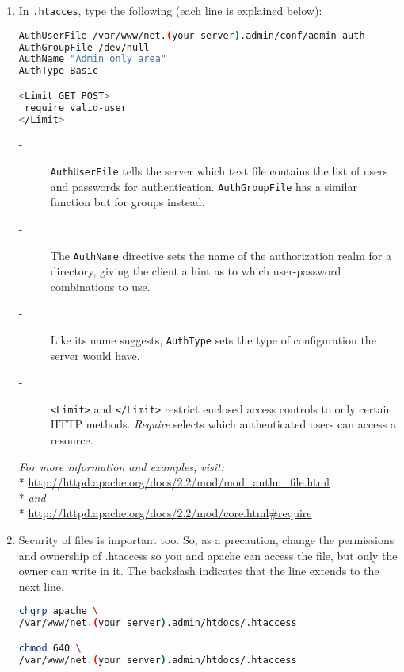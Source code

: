 \documentclass[11pt]{article}
\begin{document}
\begin {itemize}
\begin{enumerate}
    \item In \verb|.htacces|, type the following (each line is explained below):
    \begin{lstlisting}[basicstyle=\ttfamily, backgroundcolor = \color{lightgray}, language = bash, xleftmargin = 0cm, framexleftmargin = 1em, framexrightmargin = 9em, showstringspaces=false] 
AuthUserFile /var/www/net.(your server).admin/conf/admin-auth
AuthGroupFile /dev/null
AuthName "Admin only area"
AuthType Basic

<Limit GET POST>
 require valid-user
</Limit>
\end{lstlisting}
    \begin{description}
      \item[-] \verb|AuthUserFile| tells the server which text file contains the list of users and passwords for authentication. \verb|AuthGroupFile| has a similar function but for groups instead.
      \item[-] The \verb|AuthName| directive sets the name of the authorization realm for a directory, giving the client a hint as to which user-password combinations to use.
      \item[-] Like its name suggests, \verb|AuthType| sets the type of configuration the server would have.
      \item[-] \verb|<Limit>| and \verb|</Limit>| restrict enclosed access controls to only certain HTTP methods. \emph{Require} selects which authenticated users can access a resource.
    \end{description}
    \textit{For more information and examples, visit:}
    \\* \url{http://httpd.apache.org/docs/2.2/mod/mod_authn_file.html}
    \\* \emph{and}
    \\* \url{http://httpd.apache.org/docs/2.2/mod/core.html#require}

    \item Security of files is important too. So, as a precaution, change the permissions and ownership of .htaccess so you and apache can access the file, but only the owner can write in it. The backslash indicates that the line extends to the next line.
    \begin{lstlisting}[basicstyle=\ttfamily, backgroundcolor = \color{lightgray}, language = bash, xleftmargin = 0cm, framexleftmargin = 1em, framexrightmargin = 6em, showstringspaces=false] 
chgrp apache \
/var/www/net.(your server).admin/htdocs/.htaccess

chmod 640 \
/var/www/net.(your server).admin/htdocs/.htaccess
\end{lstlisting}


\end{enumerate}
\end{itemize}
\end{document}
